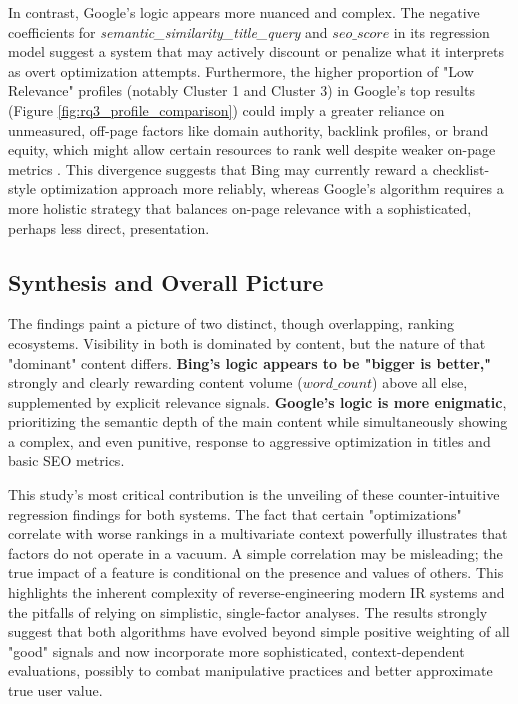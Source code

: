 \documentclass[a4paper,fleqn]{cas-sc}
\newcommand{\longvar}[1]{\textit{#1}}
\begin{document}
In contrast, Google's logic appears more nuanced and complex. The negative coefficients for \longvar{semantic_similarity_title_query} and $seo\_score$ in its regression model suggest a system that may actively discount or penalize what it interprets as overt optimization attempts. Furthermore, the higher proportion of "Low Relevance" profiles (notably Cluster 1 and Cluster 3) in Google's top results (Figure \ref{fig:rq3_profile_comparison}) could imply a greater reliance on unmeasured, off-page factors like domain authority, backlink profiles, or brand equity, which might allow certain resources to rank well despite weaker on-page metrics \citep{Toms2004}. This divergence suggests that Bing may currently reward a checklist-style optimization approach more reliably, whereas Google's algorithm requires a more holistic strategy that balances on-page relevance with a sophisticated, perhaps less direct, presentation.

\subsection{Synthesis and Overall Picture}
\label{subsec:discussion_synthesis}
The findings paint a picture of two distinct, though overlapping, ranking ecosystems. Visibility in both is dominated by content, but the nature of that "dominant" content differs. \textbf{Bing's logic appears to be "bigger is better,"} strongly and clearly rewarding content volume ($word\_count$) above all else, supplemented by explicit relevance signals. \textbf{Google's logic is more enigmatic}, prioritizing the semantic depth of the main content while simultaneously showing a complex, and even punitive, response to aggressive optimization in titles and basic SEO metrics.

This study's most critical contribution is the unveiling of these counter-intuitive regression findings for both systems. The fact that certain "optimizations" correlate with worse rankings in a multivariate context powerfully illustrates that factors do not operate in a vacuum. A simple correlation may be misleading; the true impact of a feature is conditional on the presence and values of others. This highlights the inherent complexity of reverse-engineering modern IR systems and the pitfalls of relying on simplistic, single-factor analyses. The results strongly suggest that both algorithms have evolved beyond simple positive weighting of all "good" signals and now incorporate more sophisticated, context-dependent evaluations, possibly to combat manipulative practices and better approximate true user value.
\end{document}
